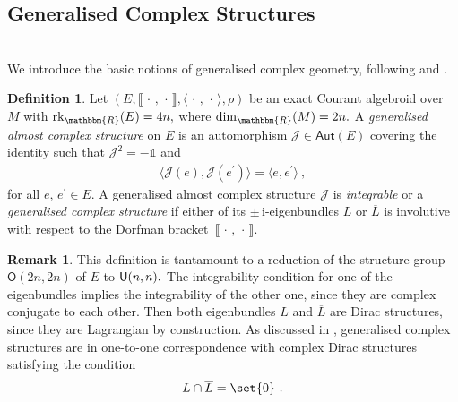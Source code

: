\documentclass[a4paper, reqno, 11pt]{amsart}
\numberwithin{equation}{section}
\theoremstyle{definition}
\newtheorem{definition}[equation]{Definition}
\newtheorem{remark}[equation]{Remark}
\newcommand{\ip}[1]{\langle #1 \rangle}
\newcommand{\ii}{\mathrm{i}}
\newcommand{\IR}{\mathbbm{R}}
\newcommand{\cJ}{{\mathcal J}}
\newcommand{\sfO}{{\mathsf{O}}}
\newcommand{\unit}{\mathds{1}}   			%
\newcommand{\rk}{\mathrm{rk}}
\theoremstyle{remark}
\begin{document}
\subsection{Generalised Complex Structures}~\\[5pt]
\label{sub:gencomplex}
We introduce the basic notions of generalised complex geometry, following \cite{Hitchin:2003cxu} and \cite[Section 4]{gualtieri:tesi}. 

\begin{definition}
Let $(E,\llbracket\,\cdot\,,\,\cdot\,\rrbracket,\langle\,\cdot\,,\,\cdot\,\rangle,\rho)$ be an exact Courant algebroid over $M$ with $\rk_\IR(E) = 4 n,$ where $\mathrm{dim}_\IR(M)=2n.$ A \emph{generalised almost complex structure} on $E$ is an automorphism $\cJ \in \mathsf{Aut}(E)$ covering the identity such that $\cJ^2 = - \unit$ and 
\begin{align}
 \ip{\cJ(e), \cJ(e^\prime)} = \ip{e, e^\prime} \ ,   
\end{align}
for all $e, \, e^\prime \in E.$ A generalised almost complex structure $\cJ$ is \emph{integrable} or a \emph{generalised complex structure} if either of its $\pm \, \ii$-eigenbundles $L$ or $\overline{L}$ is involutive with respect to the Dorfman bracket~$\llbracket \, \cdot \, , \, \cdot \, \rrbracket.$ 
\end{definition}

\begin{remark}
This definition is tantamount to a reduction of the structure group $\sfO(2n, 2n)$ of $E$ to ${\sf U}(n,n).$ The integrability condition for one of the eigenbundles implies the integrability of the other one, since they are complex conjugate to each other. Then both eigenbundles $L$ and $\overline{L}$ are Dirac structures, since they are Lagrangian by construction. As discussed in \cite{gualtieri:tesi}, generalised complex structures are in one-to-one correspondence with complex Dirac structures satisfying the condition $$L \cap \overline{L} = \set{0} \ . $$ 
\end{remark}
\end{document}
